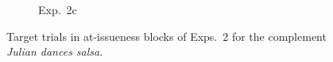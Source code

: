 \documentclass[11pt,fleqn]{article}
\newcommand{\6}{\mbox{$[\hspace*{-.6mm}[$}}
\newcommand{\9}{\mbox{$]\hspace*{-.6mm}]$}}
\begin{document}
\begin{figure}[h!]
 \begin{subfigure}[t]{0.5\textwidth}
        \centering
{}
\caption{Exp.~2c}
 \end{subfigure}

\caption{Target trials in at-issueness blocks of Exps.~2 for the complement {\em Julian dances salsa}.}\label{fig:ai-exps3}
\end{figure}
\end{document}
